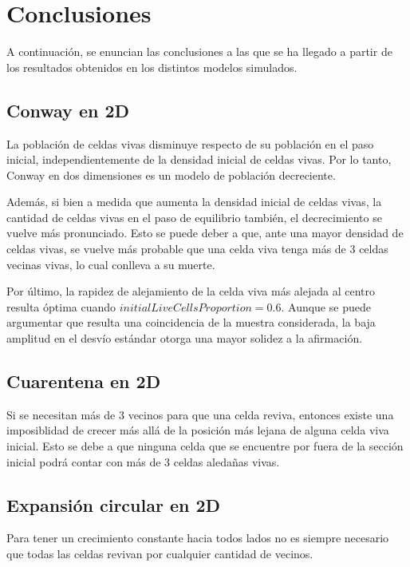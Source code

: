 \section{Conclusiones}\label{sec:conclusiones}

A continuación, se enuncian las conclusiones a las que se ha llegado a partir de los resultados obtenidos
en los distintos modelos simulados.

\subsection{Conway en 2D}\label{subsec:conway-en-2d-conc}
La población de celdas vivas disminuye respecto de su población en el paso inicial, independientemente de
la densidad inicial de celdas vivas.
Por lo tanto, Conway en dos dimensiones es un modelo de población decreciente.

Además, si bien a medida que aumenta la densidad inicial de celdas vivas, la cantidad de celdas vivas en el paso de equilibrio también,
el decrecimiento se vuelve más pronunciado.
Esto se puede deber a que, ante una mayor densidad de celdas vivas, se vuelve más probable que una celda viva
tenga más de 3 celdas vecinas vivas, lo cual conlleva a su muerte.

Por último, la rapidez de alejamiento de la celda viva más alejada al centro resulta óptima cuando
$initialLiveCellsProportion = 0.6$.
Aunque se puede argumentar que resulta una coincidencia de la muestra considerada, la baja amplitud en el
desvío estándar otorga una mayor solidez a la afirmación.

\subsection{Cuarentena en 2D}\label{subsec:cuarentena-2D-conc}

Si se necesitan más de 3 vecinos para que una celda reviva, entonces existe una imposiblidad de crecer más allá de la posición más lejana
de alguna celda viva inicial. Esto se debe a que ninguna celda que se encuentre por fuera de la sección inicial podrá contar con más de
3 celdas aledañas vivas.

\subsection{Expansión circular en 2D}\label{subsec:expansion-circular-2D-conc}

Para tener un crecimiento constante hacia todos lados no es siempre necesario que todas las celdas revivan por cualquier cantidad de vecinos.

